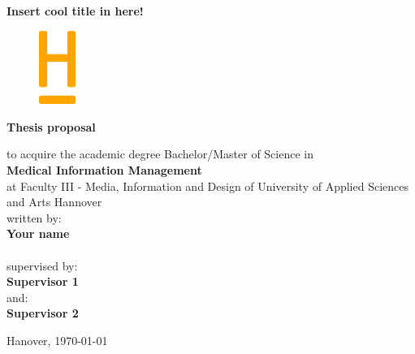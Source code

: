 \begin{titlepage}
    \begin{center}
         
        \normalsize
        \sffamily
        
        \vspace{0.8cm} 
        
        \Huge
        \textbf{Insert cool title in here! }\\

        \vspace{2.5cm}  

        \begin{figure}[t]
        	\centering
            \includegraphics[width = 12mm]{bilder/logo_hsh_onlyH.png}\\
        \end{figure}

        
        
        \normalsize
        \textbf{Thesis proposal} \\
        \vspace{0.8cm}
        
        to acquire the academic degree Bachelor/Master of Science in \\
        \textbf{Medical Information Management}\\
        at Faculty III - Media, Information and Design of University of Applied Sciences and Arts Hannover\\

        
        \vspace{0.8cm}
        written by: \\
        \large
        \textbf{Your name}\\ 
        \\
        
        \normalsize
        \vspace{0.8cm}
        supervised by:\\ 
        \large
        \textbf{Supervisor 1}\\
        \vspace{0.3cm}
        \normalsize
        and:\> \\ 
        \large
        \textbf{Supervisor 2} \\
        \normalsize
        \vspace{0.5cm}
        
        
    
        \vspace{0.3cm}
        Hanover, \today\\ %
    \end{center}
\end{titlepage}